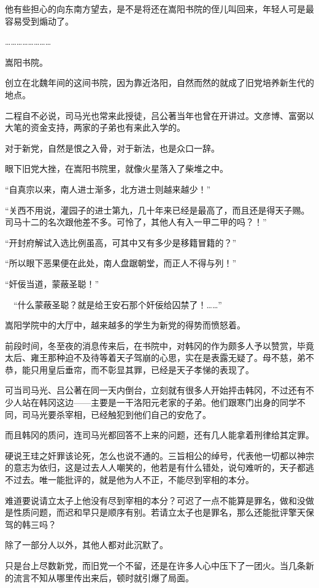 他有些担心的向东南方望去，是不是将还在嵩阳书院的侄儿叫回来，年轻人可是最容易受到煽动了。

……………………

嵩阳书院。

创立在北魏年间的这间书院，因为靠近洛阳，自然而然的就成了旧党培养新生代的地点。

二程自不必说，司马光也常来此授徒，吕公著当年也曾在开讲过。文彦博、富弼以大笔的资金支持，两家的子弟也有来此入学的。

对于新党，自然是恨之入骨，对于新法，也是众口一辞。

眼下旧党大挫，在嵩阳书院里，就像火星落入了柴堆之中。

“自真宗以来，南人进士渐多，北方进士则越来越少！”

“关西不用说，灌园子的进士第九，几十年来已经是最高了，而且还是得天子赐。司马十二的名次跟他差不多。可怜了，其他人有入一甲二甲的吗？！”

“开封府解试入选比例虽高，可其中又有多少是移籍冒籍的？”

“所以眼下恶果便在此处，南人盘踞朝堂，而正人不得与列！”

“奸佞当道，蒙蔽圣聪！”

　“什么蒙蔽圣聪？就是给王安石那个奸佞给囚禁了！……”

嵩阳学院中的大厅中，越来越多的学生为新党的得势而愤怒着。

前段时间，冬至夜的消息传来后，在书院中，对韩冈的作为颇多人予以赞赏，毕竟太后、雍王那种迫不及待等着天子驾崩的心思，实在是表露无疑了。母不慈，弟不恭，能只用皇后垂帘，而不彰显其罪，已经是天子孝悌的表现了。

可当司马光、吕公著在同一天内倒台，立刻就有很多人开始抨击韩冈，不过还有不少人站在韩冈这边——主要是一干洛阳元老家的子弟。他们跟寒门出身的同学不同，司马光要杀宰相，已经触犯到他们自己的安危了。

而且韩冈的质问，连司马光都回答不上来的问题，还有几人能拿着刑律给其定罪。

硬说王珪之奸罪该论死，怎么也说不通的。三旨相公的绰号，代表他一切都以神宗的意志为依归，这是过去人人嘲笑的，他若是有什么错处，说句难听的，天子都逃不过去。唯一能批评的，就是他为人不正，不能尽到宰相的本分。

难道要说请立太子上他没有尽到宰相的本分？可迟了一点不能算是罪名，做和没做是性质问题，而迟和早只是顺序有别。若请立太子也是罪名，那么还能批评擎天保驾的韩三吗？

除了一部分人以外，其他人都对此沉默了。

只是台上尽数新党，而旧党一个不留，还是在许多人心中压下了一团火。当几条新的流言不知从哪里传出来后，顿时就引爆了局面。

